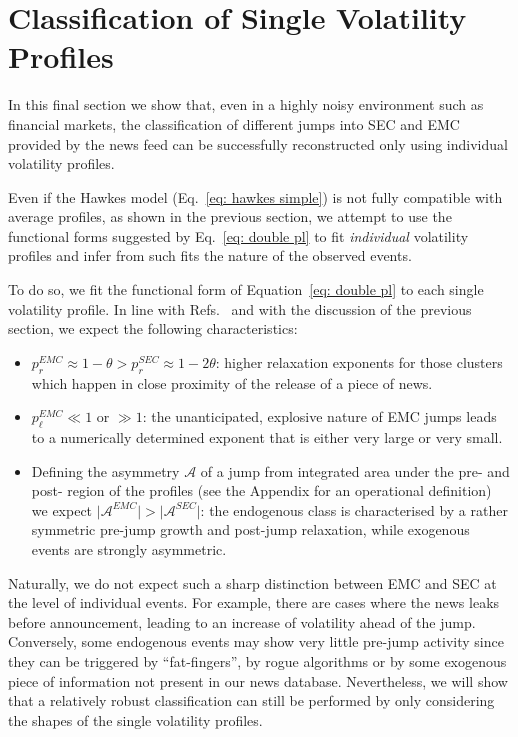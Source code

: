\documentclass[amsmath,amssymb,aps,pre,floatfix,twocolumn,superscriptaddress]{revtex4}
\begin{document}
\section{Classification of Single Volatility Profiles}

In this final section we show that, even in a highly noisy environment such as financial markets, the classification of different jumps into SEC and EMC provided by the news feed can be successfully reconstructed only using individual volatility profiles.

Even if the Hawkes model (Eq.~\eqref{eq: hawkes simple}) is not fully compatible with average profiles, as shown in the previous section, we attempt to use the functional forms suggested by Eq.~\eqref{eq: double pl} to fit {\it individual} volatility profiles and infer from such fits the nature of the observed events. 

To do so, we fit the functional form of Equation~\ref{eq: double pl} to each single volatility profile. In line with Refs.~\cite{sornette_books,sornette_youtube} and with the discussion of the previous section, we expect the following characteristics:
\begin{itemize}
\item $p_r^{EMC} \approx 1-\theta > p_r^{SEC} \approx 1 - 2\theta$:   higher relaxation exponents for those clusters which happen in close proximity of the release of a piece of news.
\item $p_\ell^{EMC} \ll 1$ or $\gg 1$: the unanticipated, explosive nature of EMC jumps leads to a numerically determined exponent that is either very large or very small. 
\item Defining the asymmetry $\mathcal{A}$ of a jump from integrated area under the pre- and post- region of the profiles (see the Appendix for an operational definition) we expect $\vert \mathcal{A}^{EMC} \vert > \vert \mathcal{A}^{SEC} \vert$: the endogenous class is characterised by a rather symmetric pre-jump growth and post-jump relaxation, while exogenous events are strongly asymmetric.  
\end{itemize}

Naturally, we do not expect such a sharp distinction between EMC and SEC at the level of individual events. For example, there are cases where the news leaks before announcement, leading to an increase of volatility ahead of the jump. Conversely, some endogenous events may show very little pre-jump activity since they can be triggered by ``fat-fingers'', by rogue algorithms or by some exogenous piece of information not present in our news database. Nevertheless, we will show that a relatively robust classification can still be performed by only considering the shapes of the single volatility profiles.
\end{document}
